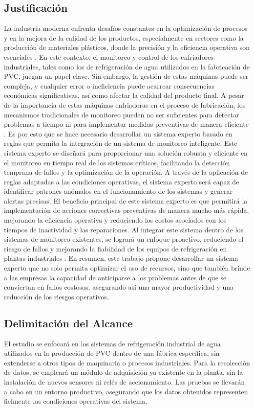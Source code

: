 \subsection{Justificación}
La industria moderna enfrenta desafíos constantes en la optimización de procesos y en la mejora de la calidad de los productos, especialmente en sectores como la producción de materiales plásticos, donde la precisión y la eficiencia operativa son esenciales \cite{Dorian}. 
En este contexto, el monitoreo y control de los enfriadores industriales, tales como los de refrigeración de agua utilizados en la fabricación de PVC, juegan un papel clave. Sin embargo, la gestión de estas máquinas puede ser compleja, y cualquier error o ineficiencia puede acarrear consecuencias económicas significativas, así como afectar la calidad del producto final.
A pesar de la importancia de estas máquinas enfriadoras en el proceso de fabricación, los mecanismos tradicionales de monitoreo pueden no ser suficientes para detectar problemas a tiempo ni para implementar medidas preventivas de manera eficiente \cite{Salvador}. 
Es por esto que se hace necesario desarrollar un sistema experto basado en reglas que permita la integración de un sistema de monitoreo inteligente. Este sistema experto se diseñará para proporcionar una solución robusta y eficiente en el monitoreo en tiempo real de los sistemas críticos, facilitando la detección temprana de fallos y la optimización de la operación. A través de la aplicación de reglas adaptadas a las condiciones operativas, el sistema experto será capaz de identificar patrones anómalos en el funcionamiento de los sistemas y generar alertas precisas.
El beneficio principal de este sistema experto es que permitirá la implementación de acciones correctivas preventivas de manera mucho más rápida, mejorando la eficiencia operativa y reduciendo los costos asociados con los tiempos de inactividad y las reparaciones. Al integrar este sistema dentro de los sistemas de monitoreo existentes, se logrará un enfoque proactivo, reduciendo el riesgo de fallos y mejorando la fiabilidad de los equipos de refrigeración en plantas industriales \cite{Shuai}.
En resumen, este trabajo propone desarrollar un sistema experto que no solo permita optimizar el uso de recursos, sino que también brinde a las empresas la capacidad de anticiparse a los problemas antes de que se conviertan en fallos costosos, asegurando así una mayor productividad y una reducción de los riesgos operativos.

\subsection{Delimitación del Alcance}
El estudio se enfocará en los sistemas de refrigeración industrial de agua utilizados en la producción de PVC dentro de una fábrica específica, sin extenderse a otros tipos de maquinaria o procesos industriales. Para la recolección de datos, se empleará un módulo de adquisición ya existente en la planta, sin la instalación de nuevos sensores ni relés de accionamiento. Las pruebas se llevarán a cabo en un entorno productivo, asegurando que los datos obtenidos representen fielmente las condiciones operativas del sistema.


